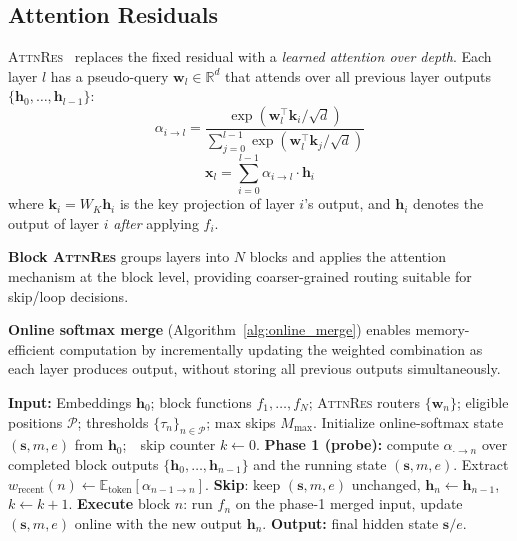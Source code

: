 \documentclass{article}
\newcommand{\attnres}{\textsc{AttnRes}}
\newcommand{\reskip}{\textsc{ReSkip}}
\newcommand{\E}{\mathbb{E}}
\newcommand{\R}{\mathbb{R}}
\begin{document}
\subsection{Attention Residuals}

\attnres{}~\citep{chen2026attnres} replaces the fixed residual with a \emph{learned attention over depth}. Each layer $l$ has a pseudo-query $\mathbf{w}_l \in \R^d$ that attends over all previous layer outputs $\{\mathbf{h}_0, \ldots, \mathbf{h}_{l-1}\}$:
\begin{equation}
    \alpha_{i \to l} = \frac{\exp(\mathbf{w}_l^\top \mathbf{k}_i / \sqrt{d})}{\sum_{j=0}^{l-1} \exp(\mathbf{w}_l^\top \mathbf{k}_j / \sqrt{d})}
    \label{eq:attnres_weights}
\end{equation}
\begin{equation}
    \mathbf{x}_l = \sum_{i=0}^{l-1} \alpha_{i \to l} \cdot \mathbf{h}_i
    \label{eq:attnres_combine}
\end{equation}
where $\mathbf{k}_i = W_K \mathbf{h}_i$ is the key projection of layer $i$'s output, and $\mathbf{h}_i$ denotes the output of layer $i$ \emph{after} applying $f_i$.

\textbf{Block \attnres{}} groups layers into $N$ blocks and applies the attention mechanism at the block level, providing coarser-grained routing suitable for skip/loop decisions.

\textbf{Online softmax merge} (Algorithm~\ref{alg:online_merge}) enables memory-efficient computation by incrementally updating the weighted combination as each layer produces output, without storing all previous outputs simultaneously.

\begin{algorithm}[t]
\caption{Two-phase \attnres{} forward with dynamic \reskip{}}
\label{alg:online_merge}
\begin{algorithmic}[1]
\STATE \textbf{Input:} Embeddings $\mathbf{h}_0$; block functions $f_1, \ldots, f_N$; \attnres{} routers $\{\mathbf{w}_n\}$; eligible positions $\mathcal{P}$; thresholds $\{\tau_n\}_{n\in\mathcal{P}}$; max skips $M_{\max}$.
\STATE Initialize online-softmax state $(\mathbf{s}, m, e)$ from $\mathbf{h}_0$;\ \ skip counter $k\gets 0$.
    \STATE \textbf{Phase 1 (probe):} compute $\alpha_{\cdot \to n}$ over completed block outputs $\{\mathbf{h}_0, \ldots, \mathbf{h}_{n-1}\}$ and the running state $(\mathbf{s}, m, e)$.
    \STATE Extract $w_{\text{recent}}(n) \gets \E_{\text{token}}[\alpha_{n-1 \to n}]$.
        \STATE \textbf{Skip}: keep $(\mathbf{s}, m, e)$ unchanged, $\mathbf{h}_n \gets \mathbf{h}_{n-1}$, $k \gets k + 1$.
    \ELSE
        \STATE \textbf{Execute} block $n$: run $f_n$ on the phase-1 merged input, update $(\mathbf{s}, m, e)$ online with the new output $\mathbf{h}_n$.
    \ENDIF
\ENDFOR
\STATE \textbf{Output:} final hidden state $\mathbf{s}/e$.
\end{algorithmic}
\end{algorithm}
\end{document}
